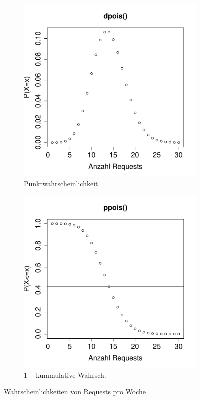 \begin{figure}[h!]
\centering
\begin{subfigure}[b]{0.48\textwidth}
\includegraphics{verteilungen-046}
\caption{Punktwahrscheinlichkeit}
\end{subfigure}
\begin{subfigure}[b]{0.48\textwidth}
\includegraphics{verteilungen-047}
\caption{$1-$kummulative Wahrsch.}
\end{subfigure}
\caption{Wahrscheinlichkeiten von Requests pro Woche}
\label{fig:embedded}
\end{figure}


